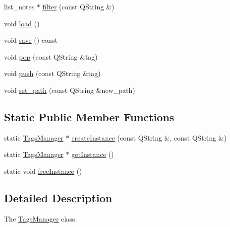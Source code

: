 \begin{DoxyCompactItemize}
list\-\_\-notes $\ast$ \hyperlink{classmanagers_1_1_tags_manager_a4a54cb372bc9e88f18b0bfcff6490232}{filter} (const Q\-String \&)
\item 
void \hyperlink{classmanagers_1_1_tags_manager_a4423932585349e735f6942d70d0a236e}{load} ()
\item 
void \hyperlink{classmanagers_1_1_tags_manager_ae1ec735d4b1520885c3c57dea0ecaf15}{save} () const 
\item 
void \hyperlink{classmanagers_1_1_tags_manager_a390501d2d80c02bdbd2877cc3ea64671}{pop} (const Q\-String \&tag)
\item 
void \hyperlink{classmanagers_1_1_tags_manager_ae1d2ab2a19caf372c47e60a5ff3ac240}{push} (const Q\-String \&tag)
\item 
void \hyperlink{classmanagers_1_1_tags_manager_a45867e0bf724ba4eedb14f55241bac93}{set\-\_\-path} (const Q\-String \&new\-\_\-path)
\end{DoxyCompactItemize}
\subsection*{Static Public Member Functions}
\begin{DoxyCompactItemize}
\item 
static \hyperlink{classmanagers_1_1_tags_manager}{Tags\-Manager} $\ast$ \hyperlink{classmanagers_1_1_tags_manager_a69c21db79b6d3330df74844f68e973d4}{create\-Instance} (const Q\-String \&, const Q\-String \&)
\item 
static \hyperlink{classmanagers_1_1_tags_manager}{Tags\-Manager} $\ast$ \hyperlink{classmanagers_1_1_tags_manager_a69ec47c2c719978ef2b79d16a67cff8e}{get\-Instance} ()
\item 
static void \hyperlink{classmanagers_1_1_tags_manager_adf57db243bf859f59e50b9e1d4b3c741}{free\-Instance} ()
\end{DoxyCompactItemize}


\subsection{Detailed Description}
The \hyperlink{classmanagers_1_1_tags_manager}{Tags\-Manager} class. 

